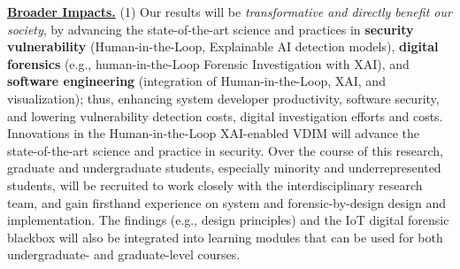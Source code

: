 \documentclass[11pt]{article}
\begin{document}
\noindent \underline{\bf Broader Impacts.}  (1) Our results will be {\em
  transformative and directly benefit our society}, by advancing the state-of-the-art science and practices in {\bf security vulnerability} (Human-in-the-Loop, Explainable AI detection models), {\bf digital forensics} (e.g., human-in-the-Loop Forensic Investigation with XAI), and {\bf software engineering} (integration of Human-in-the-Loop, XAI, and visualization); thus, enhancing system developer productivity, software security, and lowering vulnerability detection costs, digital investigation efforts and costs. 
Innovations in the Human-in-the-Loop XAI-enabled VDIM will advance the state-of-the-art science and practice in security. Over the course of this research, graduate and undergraduate students, especially minority and underrepresented students, will be recruited to work closely with the interdisciplinary research team, and gain firsthand experience on system and forensic-by-design design and implementation. The findings (e.g., design principles) and the IoT digital forensic blackbox will also be integrated into learning modules that can be used for both undergraduate- and graduate-level courses.




\end{document}
